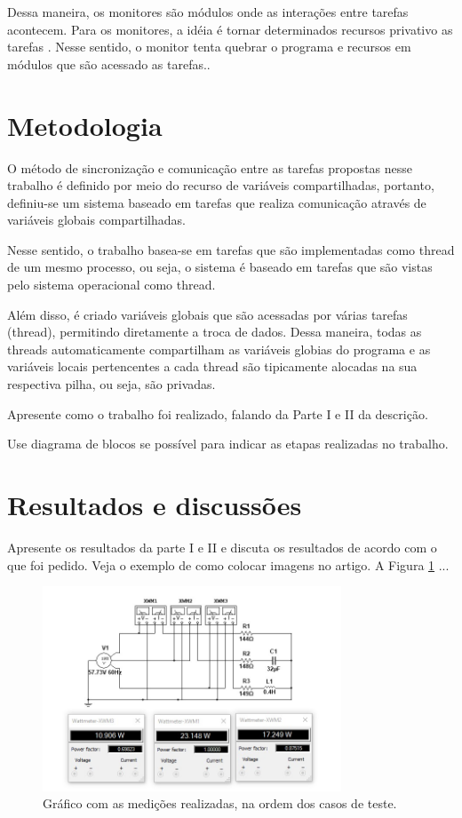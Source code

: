 \documentclass[journal]{IEEEtran}
\begin{document}
Dessa maneira, os monitores são módulos onde as interações entre tarefas acontecem. Para os monitores, a idéia é tornar determinados recursos privativo as tarefas \cite{IEEEhowto:romulo}. Nesse sentido, o monitor tenta quebrar o programa e recursos em módulos que são acessado as tarefas.. 

\section{Metodologia}

O método de sincronização e comunicação entre as tarefas propostas nesse trabalho é definido por meio do recurso de variáveis compartilhadas, portanto, definiu-se um sistema baseado em tarefas que realiza comunicação através de variáveis globais compartilhadas.

Nesse sentido, o trabalho basea-se em tarefas que são implementadas como thread de um mesmo processo, ou seja, o sistema é baseado em tarefas que são vistas pelo sistema operacional como thread.

Além disso,  é criado variáveis globais que são acessadas por várias tarefas (thread), permitindo diretamente a troca de dados. Dessa maneira, todas as threads automaticamente compartilham as variáveis globias do programa e as variáveis locais pertencentes a cada thread são tipicamente alocadas na  sua respectiva pilha, ou seja, são privadas. 

Apresente como o trabalho foi realizado, falando da Parte I e II da descrição. 

Use diagrama de blocos se possível para indicar as etapas realizadas no trabalho.

\section{Resultados e discussões}

Apresente os resultados da parte I e II e discuta os resultados de acordo com o que foi pedido. Veja o exemplo de como colocar imagens no artigo. A Figura \ref{fig1} ...

	\begin{figure}[h]
	\centering
	\includegraphics[width=3.5in]{Imagens/medidas.jpg}	
	\caption{Gráfico com as medições realizadas, na ordem dos casos de teste.}
	\label{fig1}
\end{figure}
\end{document}

